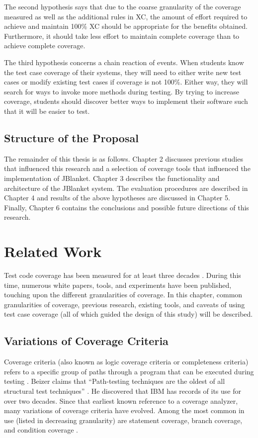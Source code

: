 The second hypothesis says that due to the coarse granularity of the
coverage measured as well as the additional rules in XC, the amount of
effort required to achieve and maintain 100\% XC should be appropriate for
the benefits obtained.  Furthermore, it should take less effort to maintain
complete coverage than to achieve complete coverage.

The third hypothesis concerns a chain reaction of events.  When students
know the test case coverage of their systems, they will need to either
write new test cases or modify existing test cases if coverage is not
100\%.  Either way, they will search for ways to invoke more methods
during testing.  By trying to increase coverage, students should discover
better ways to implement their software such that it will be easier to
test.

\section{Structure of the Proposal}
The remainder of this thesis is as follows.  Chapter 2 discusses previous
studies that influenced this research and a selection of coverage tools
that influenced the implementation of JBlanket.  Chapter 3 describes the
functionality and architecture of the JBlanket system.  The evaluation
procedures are described in Chapter 4 and results of the above hypotheses
are discussed in Chapter 5.  Finally, Chapter 6 contains the conclusions
and possible future directions of this research.

\chapter{Related Work}
Test code coverage has been measured for at least three decades
\cite{Beizer:1990}.  During this time, numerous white papers, tools, and
experiments have been published, touching upon the different granularities
of coverage.  In this chapter, common granularities of coverage, previous
research, existing tools, and caveats of using test case coverage (all of
which guided the design of this study) will be described.

\section{Variations of Coverage Criteria}
Coverage criteria (also known as logic coverage criteria or completeness
criteria) refers to a specific group of paths through a program that can be
executed during testing \cite{Kaner:1999}.  Beizer claims that
``Path-testing techniques are the oldest of all structural test
techniques'' \cite{Beizer:1990}.  He discovered that IBM has records of its
use for over two decades.  Since that earliest known reference to a
coverage analyzer, many variations of coverage criteria have evolved.
Among the most common in use (listed in decreasing granularity) are
statement coverage, branch coverage, and condition coverage
\cite{Kaner:1999}.

